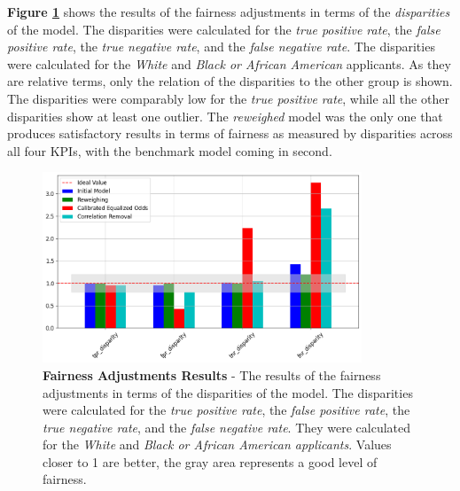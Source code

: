 \textbf{Figure \ref{fig:Fairness_Adjustments_Results_Line}} shows the results of the fairness adjustments in terms of the \textit{disparities} of the model. The disparities were calculated for the \textit{true positive rate}, the \textit{false positive rate}, the \textit{true negative rate}, and the \textit{false negative rate}. 
The disparities were calculated for the \textit{White} and \textit{Black or African American} applicants. As they are relative terms, only the relation of the disparities to the other group is shown.
The disparities were comparably low for the \textit{true positive rate}, while all the other disparities show at least one outlier. The \textit{reweighed} model was the only one that produces satisfactory results in terms of fairness as measured by disparities across all four KPIs, with the benchmark model coming in second.

\begin{figure}[!htbp]
    \centering
    \includegraphics[width=0.85\textwidth]{images/CHXX_Update_Results_Line.png}
    \caption[Fairness Adjustments Results]{\textbf{Fairness Adjustments Results} - The results of the fairness adjustments in terms of the disparities of the model. The disparities were calculated for the \textit{true positive rate}, the \textit{false positive rate}, the \textit{true negative rate}, and the \textit{false negative rate}. 
    They were calculated for the \textit{White} and \textit{Black or African American applicants}. Values closer to 1 are better, the gray area represents a good level of fairness.}
    \label{fig:Fairness_Adjustments_Results_Line}
\end{figure}

